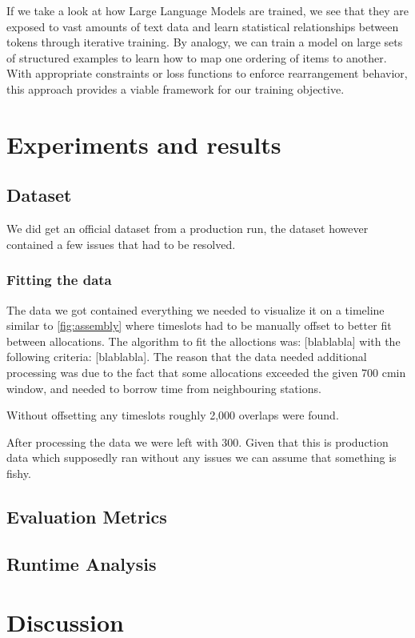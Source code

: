 \documentclass[12pt,a4paper]{report}
\begin{document}
If we take a look at how Large Language Models are trained, we see that they are exposed to vast amounts of text data and learn statistical relationships between tokens through iterative training. By analogy, we can train a model on large sets of structured examples to learn how to map one ordering of items to another. With appropriate constraints or loss functions to enforce rearrangement behavior, this approach provides a viable framework for our training objective.



\chapter{Experiments and results}
\section{Dataset}
We did get an official dataset from a production run, the dataset however contained a few issues that had to be resolved.
\subsection{Fitting the data}
    The data we got contained everything we needed to visualize it on a timeline similar to \autoref{fig:assembly} where timeslots had to be manually offset to better fit between allocations. The algorithm to fit the alloctions was: [blablabla] with the following criteria: [blablabla]. The reason that the data needed additional processing was due to the fact that some allocations exceeded the given 700 cmin window, and needed to borrow time from neighbouring stations.

    Without offsetting any timeslots roughly 2,000 overlaps were found.
    
    After processing the data we were left with 300. Given that this is production data which supposedly ran without any issues we can assume that something is fishy. %
\section{Evaluation Metrics}
\section{Runtime Analysis}

\chapter{Discussion}
\end{document}
